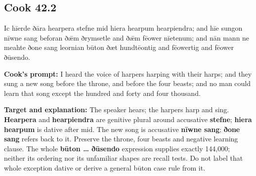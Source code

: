 \par\begin{minipage}{\linewidth}\raggedright
\subsection*{Cook 42.2}

Ic hīerde ðāra hearpera stefne mid hiera hearpum hearpiendra; and hīe sungon nīwne sang beforan ðǣm ðrymsetle and ðǣm fēower nīetenum; and nān mann ne meahte ðone sang leornian būton ðæt hundtēontig and fēowertig and fēower ðūsendo.

\textbf{Cook's prompt:} I heard the voice of harpers harping with their harps; and they sung a new song before the throne, and before the four beasts; and no man could learn that song except the hundred and forty and four thousand.

\textbf{Target and explanation:} The speaker hears; the harpers harp and sing. \textbf{Hearpera} and \textbf{hearpiendra} are genitive plural around accusative \textbf{stefne}; \textbf{hiera hearpum} is dative after mid. The new song is accusative \textbf{nīwne sang}; \textbf{ðone sang} refers back to it. Preserve the throne, four beasts and negative learning clause. The whole \textbf{būton … ðūsendo} expression supplies exactly 144,000; neither its ordering nor its unfamiliar shapes are recall tests. Do not label that whole exception dative or derive a general būton case rule from it.

\end{minipage}\par\addvspace{4pt}

